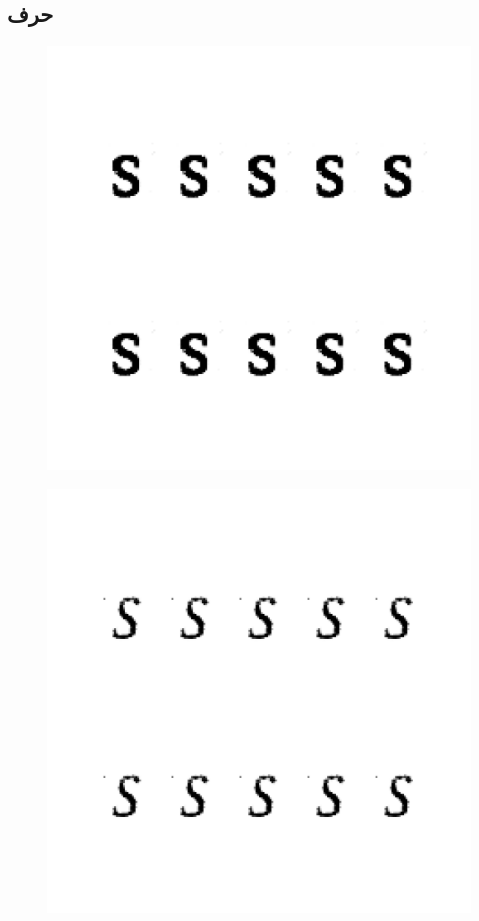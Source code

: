 \documentclass{article}
\begin{document}
\subsection{حرف }
\begin{figure}[H]
	\centerline{\includegraphics[width=\textwidth , height=\textheight ]{../results/CGAN_Adam/figs/letters/S/95.pdf}}
\end{figure}
\begin{figure}[H]
	\centerline{\includegraphics[width=\textwidth , height=\textheight ]{../results/CGAN_Adam/figs/letters/S/90.pdf}}
\end{figure}
\end{document}
